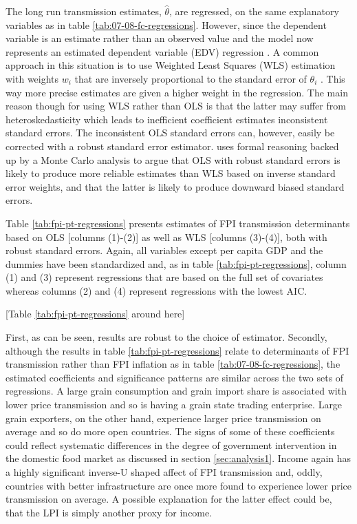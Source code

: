 \documentclass[12pt,english]{article}
\begin{document}
The long run transmission estimates, $\hat{\theta}$, are regressed, on the same explanatory variables as in table \ref{tab:07-08-fc-regressions}. However, since the dependent variable is an estimate rather than an observed value and the model now represents an estimated dependent variable (EDV) regression \citep[see][]{hanushek74, lewis05}. A common approach in this situation is to use Weighted Least Squares (WLS) estimation with weights $w_{i}$ that are inversely proportional to the standard error of $\theta_{i}$ \citep{saxonhouse76}. This way more precise estimates are given a higher weight in the regression. The main reason though for using WLS rather than OLS is that the latter may suffer from heteroskedasticity which leads to inefficient coefficient estimates inconsistent standard errors. The inconsistent OLS standard errors can, however, easily be corrected with a robust standard error estimator. \citet{lewis05} uses formal reasoning backed up by a Monte Carlo analysis to argue that OLS with robust standard errors is likely to produce more reliable estimates than WLS based on inverse standard error weights, and that the latter is likely to produce downward biased standard errors.

Table \ref{tab:fpi-pt-regressions} presents estimates of FPI transmission determinants based on OLS [columns (1)-(2)] as well as WLS [columns (3)-(4)], both with robust standard errors. Again, all variables except per capita GDP and the dummies have been standardized and, as in table \ref{tab:fpi-pt-regressions}, column (1) and (3) represent regressions that are based on the full set of covariates whereas columns (2) and (4) represent regressions with the lowest AIC. 

\begin{center}
[Table \ref{tab:fpi-pt-regressions} around here]
\par\end{center}

First, as can be seen, results are robust to the choice of estimator. Secondly, although the results in table \ref{tab:fpi-pt-regressions} relate to determinants of FPI transmission rather than FPI inflation as in table \ref{tab:07-08-fc-regressions}, the estimated coefficients and significance patterns are similar across the two sets of regressions. A large grain consumption and grain import share is associated with lower price transmission and so is having a grain state trading enterprise. Large grain exporters, on the other hand, experience larger price transmission on average and so do more open countries. The signs of some of these coefficients could reflect systematic differences in the degree of government intervention in the domestic food market as discussed in section \ref{sec:analysis1}. Income again has a highly significant inverse-U shaped affect of FPI transmission and, oddly, countries with better infrastructure are once more found to experience lower price transmission on average. A possible explanation for the latter effect could be, that the LPI is simply another proxy for income.
\end{document}
